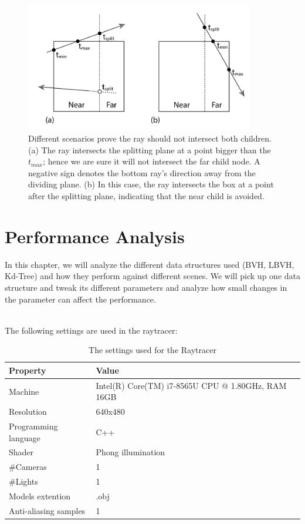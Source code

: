 \documentclass[11pt,a4paper]{article}
\begin{document}
\begin{figure}[H]	
     \centering
     \captionsetup{justification=centering,margin=2cm}
     \includegraphics[width=10cm]{images/kdtree/traversal_case.png}
     \caption{Different scenarios prove the ray should not intersect both children.(a) The ray intersects the splitting plane at a point bigger than the $t_{max}$; hence we are sure it will not intersect the far child node. A negative sign denotes the bottom ray's direction away from the dividing plane. (b) In this case, the ray intersects the box at a point after the splitting plane, indicating that the  near child is avoided. \protect\cite{Pharr2016}}
        \label{fig:dice}
\end{figure}

\clearpage

\section{Performance Analysis}
In this chapter, we will analyze the different data structures used (BVH, LBVH, Kd-Tree) and how they perform against different scenes. We will pick up one data structure and tweak its different parameters and analyze how small changes in the parameter can affect the performance.

\noindent
\\
The following settings are used in the raytracer:

\newcommand\T{\rule{0pt}{2.6ex}}       %
\newcommand\B{\rule[-1.2ex]{0pt}{0pt}} %

\begin{table}[H] 
\centering 
{\footnotesize
\begin{tabular}{ P{2.5cm} P{5cm}  P{5cm}}      %
\hline \hline
Property & Value \T\B  \\
\hline \hline
Machine & Intel(R) Core(TM) i7-8565U CPU @ 1.80GHz, RAM 16GB \T\B \\
 \hline
Resolution & 640x480  \T\B
\\
 \hline
Programming language & C++  \T\B 
\\ 
 \hline
Shader & Phong illumination \T\B 
\\
 \hline
\#Cameras & 1 \T\B 
\\
\#Lights & 1  \T\B 
\\ 
 \hline
 Models extention& .obj \T\B 
\\ 
 \hline
Anti-aliasing samples & 1 \T\B 
\\ 
\hline \hline
    \end{tabular}
}
  \caption{The settings used for the Raytracer}
\end{table}
\end{document}
